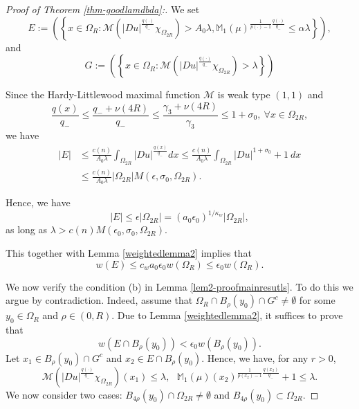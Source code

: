 \documentclass[a4paper,10pt]{amsart}
\newcommand{\Mu}{\mathbb{M}_1(\mu)}
\newcommand{\pd}{p(\cdot)}
\newcommand{\f}{\frac}
\newcommand{\Om}{\Omega}
\begin{document}
	\begin{proof}
		[Proof of Theorem \ref{thm-goodlamdbda}:]
		We set 
		$$
		E:=\left(\left\{x\in \Om_{R}:\mathcal{M}(|Du|^{\f{q(\cdot)}{q_-}}\chi_{\Om_{2R}})>A_0\lambda, \Mu^{\f{1}{\pd-1}\f{q(\cdot)}{q_-}} \leq \alpha \lambda\right\}\right),
		$$
		and 
		$$
		G:=\left(\left\{x\in \Om_{R}:\mathcal{M}(|Du|^{\f{q(\cdot)}{q_-}}\chi_{\Om_{2R}})> \lambda\right\}\right)
		$$
		
			
		Since the Hardy-Littlewood maximal function $\mathcal{M}$ is weak type $(1,1)$ and 
		$$
		\f{q(x)}{q_-}\leq \f{q_-+\nu(4R)}{q_-}\leq \f{\gamma_3 +\nu(4R)}{\gamma_3}\leq 1+\sigma_0, \ \forall x\in \Om_{2R}, 
		$$
		we have
		$$
		\begin{aligned}
		|E|&\leq \f{c(n)}{A_0\lambda}\int_{\Om_{2R}}|Du|^{\f{q(x)}{q_-}}dx\leq \f{c(n)}{A_0\lambda}\int_{\Om_{2R}}|Du|^{1+\sigma_0}+1 \ dx\\
		&\leq \f{c(n)}{A_0\lambda}|\Om_{2R}|M(\epsilon,\sigma_0,\Om_{2R}).
		\end{aligned}
		$$
		
		Hence, we have
		$$
		|E|\leq \epsilon|\Om_{2R}|= (a_0\epsilon_0)^{1/\kappa_w} |\Om_{2R}|,
		$$
		as long as $\lambda>c(n)M(\epsilon_0,\sigma_0, \Om_{2R})$.
		
		This together with Lemma \ref{weightedlemma2} implies that
		$$
		w(E)\leq  c_wa_0\epsilon_0w(\Om_{R})\leq \epsilon_0w(\Om_{R}). 
		$$
		
		We now verify the condition {\rm (b)} in Lemma \ref{lem2-proofmainresutls}. To do this we argue by contradiction. 
		Indeed, assume that $\Om_{R}\cap B_{\rho}(y_0)\cap G^c\neq \emptyset$ for some $y_0\in \Om_{R}$ and $\rho\in (0, R)$. 
		Due to Lemma \ref{weightedlemma2}, it suffices to prove that
		\begin{equation}\label{eq1-proof thm goodlambda}
		w(E\cap B_{\rho}(y_0))< \epsilon_0 w(B_{\rho}(y_0)).
		\end{equation}
		Let $x_1\in B_{\rho}(y_0)\cap G^c$ and $x_2\in E\cap B_{\rho}(y_0)$. Hence, we have, for any $r>0$,
		\begin{equation}\label{eq2-proof thm goodlambda}
		\mathcal{M}(|Du|^{\f{q(\cdot)}{q_-}}\chi_{\Om_{2R}})(x_1)\leq \lambda, \ \ \ \Mu (x_2)^{\f{1}{p(x_2)-1}\f{q(x_2)}{q_-}}+1\leq \lambda. 
		\end{equation}
		We now consider two cases:  $B_{4\rho}(y_0)\cap \Omega_{2R}\neq \emptyset$ and $B_{4\rho}(y_0)\subset \Omega_{2R}$.
		

\end{proof}
\end{document}
